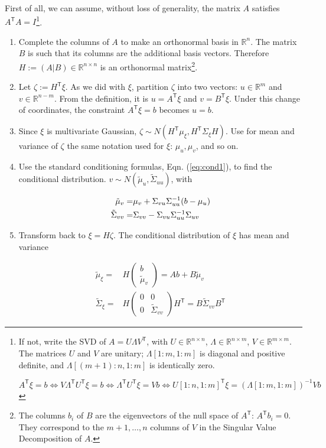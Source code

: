 \documentclass[letter, 12pt]{article}
\newcommand{\transpose}{^\mathsf{T}}
\newcommand{\R}{\mathbb{R}}
\newcommand{\inv}{^{-1}}
\begin{document}
First of all, we can assume, without loss of generality, the matrix $A$ satisfies $A\transpose A= I$\footnote{If not, write the SVD of $A=U\Lambda V\transpose$, with $U\in\R^{n\times n}$, $\Lambda \in\R^{n\times m}$, $V\in\R^{m\times m}$. The matrices $U$ and $V$ are unitary; $\Lambda[1:m, 1:m]$ is diagonal and positive definite, and $\Lambda[(m+1):n, 1:m]$ is identically zero.

\[
A\transpose\xi=b \Leftrightarrow V\Lambda\transpose U\transpose \xi = b \Leftrightarrow \Lambda\transpose U\transpose \xi = V b \Leftrightarrow U[1:n, 1:m]\transpose \xi = (\Lambda[1:m, 1:m])\inv V b
\]}.
%
\begin{enumerate}
\item Complete the columns of $A$ to make an orthonormal basis in $\R^n$. The matrix $B$ is such that its columns are the additional basis vectors. Therefore $H:=(A | B)\in\R^{n\times n}$ is an orthonormal matrix\footnote{The columns $b_i$ of $B$ are the eigenvectors of the null space of $A\transpose$: $A\transpose b_i=0$. They correspond to the $m+1,\ldots, n$ columns of $V$ in the Singular Value Decomposition of $A$.}.

\item Let $\zeta:=H\transpose \xi$. As we did with $\xi$, partition $\zeta$ into two vectors: $u\in\R^m$ and $v\in\R^{n-m}$. From the definition, it is $u=A\transpose\xi$ and $v=B\transpose\xi$. Under this change of coordinates, the constraint $A\transpose \xi=b$ becomes $u=b$.

\item Since $\xi$ is multivariate Gaussian, $\zeta\sim N(H\transpose\mu_\xi, H\transpose \Sigma_\xi H)$. Use for mean and variance of $\zeta$ the same notation used for $\xi$: $\mu_u,\mu_v$, and so on.

\item Use the standard conditioning formulas, Eqn. (\ref{eq:cond1}), to find the conditional distribution. $v\sim N(\tilde \mu_u, \tilde \Sigma_{uu})$, with

\begin{align}
\tilde\mu_v=&\mu_v + \Sigma_{vu} \Sigma_{uu}\inv(b-\mu_u) \notag \\
\tilde\Sigma_{vv}=& \Sigma_{vv} - \Sigma_{vu} \Sigma_{uu}\inv \Sigma_{uv} \notag
\end{align}
%
\item Transform back to $\xi=H\zeta$. The conditional distribution of $\xi$ has mean and variance

\begin{align*}
\tilde \mu_\xi=& H\left(
\begin{array}{c}
b\\
\tilde\mu_v
\end{array}
\right) = Ab + B \tilde\mu_v \\
\tilde \Sigma_{\xi}= & H
\left(
\begin{array}{cc}
0 & 0\\
0 & \tilde\Sigma_{vv}
\end{array}
\right) H\transpose = B\tilde\Sigma_{vv} B\transpose
\end{align*}
\end{enumerate}
\end{document}
